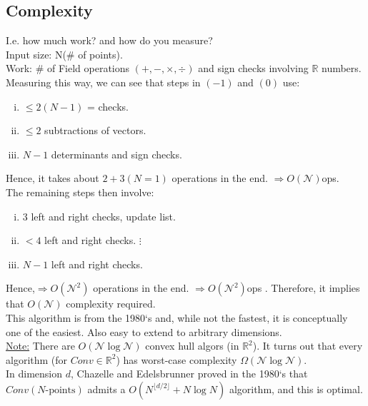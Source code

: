 \documentclass[]{article}
\theoremstyle{definition}
\begin{document}
			\subsection{Complexity}
			I.e. how much work? and how do you measure?\\
			Input size: N(\# of points).\\ Work: \# of Field operations $(+,-,\times,\div)$ and sign checks involving $\mathbb{R}$ numbers.\\
			Measuring this way, we can see that steps in $(-1)$ and $(0)$ use:
			\begin{enumerate}[(i)]
				\item $\leq 2(N-1)$ = checks.
				\item $\leq 2$ subtractions of vectors.
				\item $N-1$ determinants and sign checks.
			\end{enumerate}
			Hence, it takes about $2+3(N=1)$ operations in the end. $\Rightarrow O(\mathcal{N})$ops.\\
			The remaining steps then involve:
			\begin{enumerate}[(i)]
				\item 3 left and right checks, update list.
				\item $<4$ left and right checks.
				$\vdots$
				\item $N-1$ left and right checks.
			\end{enumerate}
			Hence,$\Rightarrow O(\mathcal{N}^2)$ operations in the end. $\Rightarrow O(\mathcal{N}^2)$ops . Therefore, it implies that $O(\mathcal{N})$ complexity required.\\
			This algorithm is from the 1980`s and, while not the fastest, it is conceptually one of the easiest. Also easy to extend to arbitrary dimensions.\\
			
			\underline{Note:} There are $O(\mathcal{N}\log\mathcal{N})$ convex hull algors (in $\mathbb{R}^2$). It turns out that every algorithm (for $Conv \in \mathbb{R}^2$) has worst-case complexity $\Omega(\mathcal{N}\log\mathcal{N})$.\\
			In dimension $d$, Chazelle and Edelsbrunner proved in the 1980`s that $Conv(N\text{-points})$ admits a $O(N^{\lfloor d/2 \rfloor}+N\log N)$ algorithm, and this is optimal.\\
\end{document}
